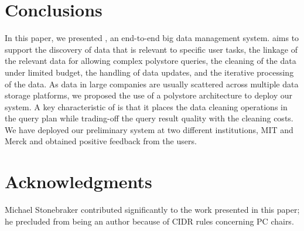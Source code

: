 \section{Conclusions}
\label{sec:conclusion}

In this paper, we presented \dcv,  an end-to-end big data management system. 
\dcv aims to support  the discovery of data that is relevant to specific user tasks, 
the linkage of the relevant data for allowing complex polystore queries, 
the cleaning of the data under limited budget, 
the handling of  data updates, 
and the iterative processing of the data. 
As data in large companies are usually scattered across multiple
data storage platforms, we proposed the use of a polystore architecture to deploy our system.
A key characteristic of \dcv is that it places the data cleaning operations in the query plan
while  trading-off the query result quality with the cleaning costs. 
We have deployed our preliminary system at two different institutions, MIT and Merck and obtained positive
feedback from the users.

\section{Acknowledgments}

 Michael Stonebraker contributed significantly to the work presented in this paper;
 he precluded from being an author because of CIDR rules concerning PC chairs.


